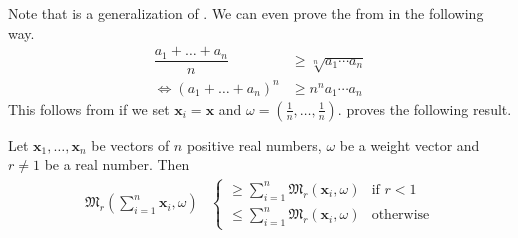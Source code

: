 \documentclass[inequalities.tex]{subfile}
\begin{document}
	Note that  is a generalization of . We can even prove the  from  in the following way.
		\begin{align*}
			\dfrac{a_{1}+\ldots+a_{n}}{n}
				& \geq \sqrt[n]{a_{1}\cdots a_{n}}\\
			\iff (a_{1}+\ldots+a_{n})^{n}
				& \geq n^{n}a_{1}\cdots a_{n}
		\end{align*}
	This follows from  if we set $\mathbf{x}_{i}=\mathbf{x}$ and $\omega=\left(\frac{1}{n},\ldots,\frac{1}{n}\right)$. \textcite[Page $115-117$]{minkowski_1968} proves the following result.
		\begin{theorem}\label{thm:mink}
			Let $\mathbf{x}_{1},\ldots,\mathbf{x}_{n}$ be vectors of $n$ positive real numbers, $\omega$ be a weight vector and $r\neq1$ be a real number. Then
				\begin{align*}
					\mathfrak{M}_{r}\left(\sum\limits_{i=1}^{n}\mathbf{x}_{i},\omega\right)
						&
							\begin{cases}
								\geq \sum\limits_{i=1}^{n}\mathfrak{M}_{r}(\mathbf{x}_{i},\omega)& \mbox{if }r<1\\
								\leq \sum\limits_{i=1}^{n}\mathfrak{M}_{r}(\mathbf{x}_{i}, \omega)& \mbox{otherwise}
							\end{cases}
				\end{align*}
		\end{theorem}
\end{document}
